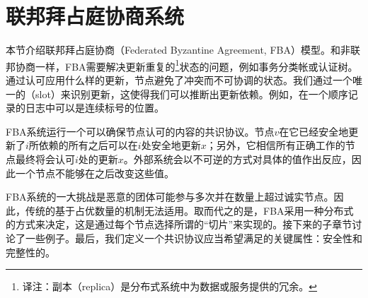 \section{联邦拜占庭协商系统}\label{sec:fba}

本节介绍联邦拜占庭协商（Federated Byzantine Agreement, FBA）模型。和非联邦协商一样，FBA需要解决更新重复的\footnote{译注：副本（replica）是分布式系统中为数据或服务提供的冗余。}状态的问题，例如事务分类帐或认证树。通过认可应用什么样的更新，节点避免了冲突而不可协调的状态。我们通过一个唯一的{\slot}（slot）来识别更新，这使得我们可以推断出更新依赖。例如，在一个顺序记录的日志中{\slot}可以是连续标号的位置。

FBA系统运行一个可以确保节点认可{\slot}的内容的共识协议。节点$v$在它已经安全地更新了{\slot}$i$所依赖的所有{\slot}之后可以在{\slot}$i$处安全地更新$x$；另外，它相信所有正确工作的节点最终将会认可{\slot}$i$处的更新$x$。外部系统会以不可逆的方式对具体的值作出反应，因此一个节点不能够在之后改变这些值。

FBA系统的一大挑战是恶意的团体可能参与多次并在数量上超过诚实节点。因此，传统的基于占优数量的{\quorum}机制无法适用。取而代之的是，FBA采用一种分布式的方式来决定{\quorum}，这是通过每个节点选择所谓的``{\quorum}切片''来实现的。接下来的子章节讨论了一些例子。最后，我们定义一个共识协议应当希望满足的关键属性：安全性和完整性的。



